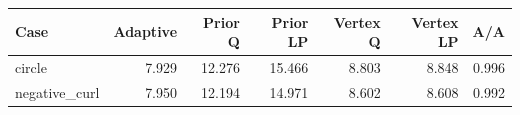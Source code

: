 \begin{tabular}{lrrrrrr}
\toprule
Case & Adaptive & Prior Q & Prior LP & Vertex Q & Vertex LP & A/A \\
\midrule
circle & 7.929 & 12.276 & 15.466 & 8.803 & 8.848 & 0.996 \\
negative\_curl & 7.950 & 12.194 & 14.971 & 8.602 & 8.608 & 0.992 \\
\bottomrule
\end{tabular}

